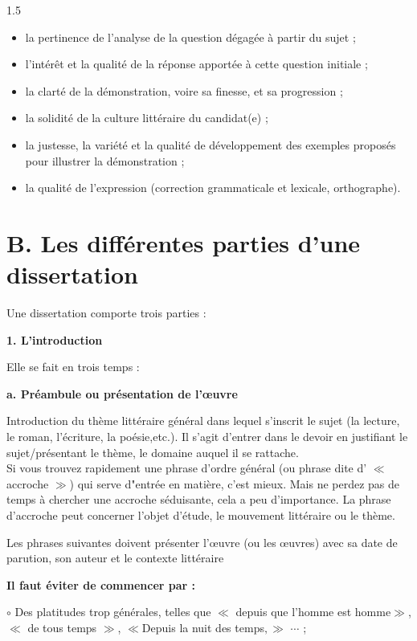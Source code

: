 \documentclass[12pt]{article}
\begin{document}
\begin{spacing}{1.5}
\begin{itemize}
 \item la pertinence de l'analyse de la question dégagée à partir du sujet ;
 \item l'intérêt et la qualité de la réponse apportée à cette question initiale ;
\item la clarté de la démonstration, voire sa finesse, et sa progression ;
 \item la solidité de la culture littéraire du candidat(e) ;
 \item la justesse, la variété et la qualité de développement des exemples proposés pour illustrer la démonstration ;
 \item la qualité de l'expression (correction grammaticale et lexicale, orthographe).
\end{itemize}

\section*{B. Les différentes parties d'une dissertation}

Une dissertation comporte trois parties :

\quad
\textbf{ 1. L'introduction}

 Elle se fait en trois temps :

\quad

\textbf{a. Préambule ou présentation de l'œuvre}


Introduction du thème littéraire général dans lequel s'inscrit le sujet (la lecture, le roman, l'écriture, la poésie,etc.). Il s'agit d'entrer dans le devoir en justifiant le sujet/présentant le thème, le domaine auquel il se rattache.\\
Si vous trouvez rapidement une phrase d'ordre général (ou phrase dite d' $\ll$ accroche $\gg$) qui serve d"entrée en matière, c'est mieux. Mais ne perdez pas de temps à chercher une 
accroche séduisante, cela a peu d'importance. La phrase d'accroche peut concerner l'objet d'étude, le mouvement littéraire ou le thème.

Les phrases suivantes doivent présenter l'œuvre (ou les œuvres) avec sa 
date de parution, son auteur et le contexte littéraire
 
\textbf{ Il faut éviter de commencer par :}

$\circ$ Des platitudes trop générales, telles que $\ll$ depuis que l'homme est homme$\gg$, $\ll$ de tous temps $\gg$, $\ll$Depuis la nuit des temps$,\gg$ $\cdots$ ;


\end{spacing}
\end{document}
